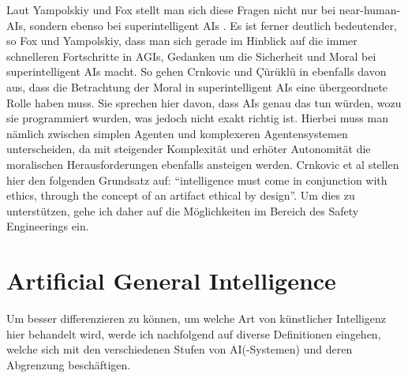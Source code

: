     Laut Yampolskiy und Fox stellt man sich diese Fragen nicht nur bei near-human-AIs, sondern 
    ebenso bei superintelligent AIs \cite[p. 2]{yampolskiy2013safety}. Es ist ferner deutlich 
    bedeutender, so Fox und Yampolskiy, dass man sich gerade im Hinblick auf die immer schnelleren
    Fortschritte in AGIs, Gedanken um die Sicherheit und Moral bei superintelligent AIs macht. 
    So gehen Crnkovic und {\c{C}}{\"u}r{\"u}kl{\"u} in \cite[p. 1]{crnkovic2012robots} ebenfalls
    davon aus, dass die Betrachtung der Moral in superintelligent AIs eine übergeordnete Rolle 
    haben muss. Sie sprechen hier davon, dass AIs genau das tun würden, wozu sie programmiert 
    wurden, was jedoch nicht exakt richtig ist. Hierbei muss man nämlich zwischen simplen Agenten 
    und komplexeren Agentensystemen unterscheiden, da mit steigender Komplexität und erhöter 
    Autonomität die moralischen Herausforderungen ebenfalls ansteigen werden. Crnkovic et al
    stellen hier den folgenden Grundsatz auf: ``intelligence must come in conjunction with ethics,
    through the concept of an artifact ethical by design''. Um dies zu unterstützen, gehe ich daher
    auf die Möglichkeiten im Bereich des Safety Engineerings ein.
    
\section{Artificial General Intelligence}
    Um besser differenzieren zu können, um welche Art von künstlicher Intelligenz hier behandelt 
    wird, werde ich nachfolgend auf diverse Definitionen eingehen, welche sich mit den verschiedenen
    Stufen von AI(-Systemen) und deren Abgrenzung beschäftigen. 
    
